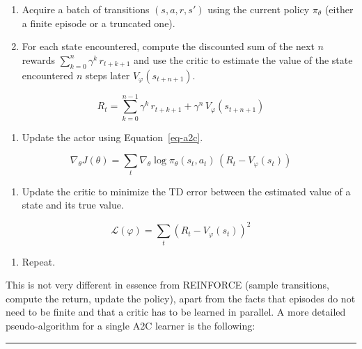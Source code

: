 \documentclass[
  letterpaper,
  DIV=11,
  numbers=noendperiod]{scrreprt}
\providecommand{\tightlist}{%
  \setlength{\itemsep}{0pt}\setlength{\parskip}{0pt}}\usepackage{longtable,booktabs,array}
\begin{document}
\begin{enumerate}
\def\labelenumi{\arabic{enumi}.}
\item
  Acquire a batch of transitions \((s, a, r, s')\) using the current
  policy \(\pi_\theta\) (either a finite episode or a truncated one).
\item
  For each state encountered, compute the discounted sum of the next
  \(n\) rewards \(\sum_{k=0}^{n} \gamma^{k} \, r_{t+k+1}\) and use the
  critic to estimate the value of the state encountered \(n\) steps
  later \(V_\varphi(s_{t+n+1})\).
\end{enumerate}

\[
    R_t = \sum_{k=0}^{n-1} \gamma^{k} \, r_{t+k+1} + \gamma^n \, V_\varphi(s_{t+n+1})
\]

\begin{enumerate}
\def\labelenumi{\arabic{enumi}.}
\setcounter{enumi}{2}
\tightlist
\item
  Update the actor using Equation~\ref{eq-a2c}.
\end{enumerate}

\[
    \nabla_\theta J(\theta) =  \sum_t \nabla_\theta \log \pi_\theta(s_t, a_t) \, (R_t - V_\varphi(s_t))
\]

\begin{enumerate}
\def\labelenumi{\arabic{enumi}.}
\setcounter{enumi}{3}
\tightlist
\item
  Update the critic to minimize the TD error between the estimated value
  of a state and its true value.
\end{enumerate}

\[
    \mathcal{L}(\varphi) = \sum_t (R_t - V_\varphi(s_t))^2
\]

\begin{enumerate}
\def\labelenumi{\arabic{enumi}.}
\setcounter{enumi}{4}
\tightlist
\item
  Repeat.
\end{enumerate}

This is not very different in essence from REINFORCE (sample
transitions, compute the return, update the policy), apart from the
facts that episodes do not need to be finite and that a critic has to be
learned in parallel. A more detailed pseudo-algorithm for a single A2C
learner is the following:

\begin{center}\rule{0.5\linewidth}{0.5pt}\end{center}
\end{document}
